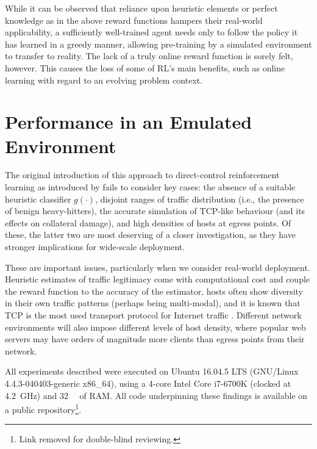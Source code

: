 \documentclass[conference, letterpaper, 10pt, times]{IEEEtran}
\begin{document}

While it can be observed that reliance upon heuristic elements or perfect knowledge as in the above reward functions hampers their real-world applicability, a sufficiently well-trained agent needs only to follow the policy it has learned in a greedy manner, allowing pre-training by a simulated environment to transfer to reality.
The lack of a truly online reward function is sorely felt, however.
This causes the loss of some of RL's main benefits, such as online learning with regard to an evolving problem context.

\section{Performance in an Emulated Environment}\label{sec:performance-in-an-emulated-environment}
The original introduction of this approach to direct-control reinforcement learning as introduced by \textcite{DBLP:journals/eaai/MalialisK15} fails to consider key cases: the absence of a suitable heuristic classifier $g(\cdot)$, disjoint ranges of traffic distribution (i.e., the presence of benign heavy-hitters), the accurate simulation of TCP-like behaviour (and its effects on collateral damage), and high densities of hosts at egress points.
Of these, the latter two are most deserving of a closer investigation, as they have stronger implications for wide-scale deployment.

These are important issues, particularly when we consider real-world deployment.
Heuristic estimates of traffic legitimacy come with computational cost and couple the reward function to the accuracy of the estimator, hosts often show diversity in their own traffic patterns (perhaps being multi-modal), and it is known that TCP is the most used transport protocol for Internet traffic \cite{DBLP:conf/saint/ZhangDJC09}.
Different network environments will also impose different levels of host density, where popular web servers may have orders of magnitude more clients than egress points from their network.

All experiments described were executed on Ubuntu 16.04.5 LTS (GNU/Linux 4.4.3-040403-generic x86\_64), using a 4-core Intel Core i7-6700K (clocked at \SI{4.2}{\giga\hertz}) and \SI{32}{\gibi\byte} of RAM.
All code underpinning these findings is available on a public repository\footnote{Link removed for double-blind reviewing.}.
\end{document}
